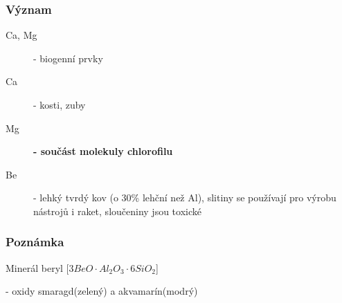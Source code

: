     \subsubsection{Význam}
    \begin{description}
        \item[Ca, Mg] - biogenní prvky
        \item[Ca] - kosti, zuby
        \item[Mg] \textbf{- součást molekuly chlorofilu}
        \item[Be] - lehký tvrdý kov (o 30\% lehční než Al), slitiny se používají pro výrobu nástrojů i raket, sloučeniny jsou toxické
    \end{description}

    \subsubsection{Poznámka}
    Minerál beryl [$3BeO \cdot Al_2O_3 \cdot 6SiO_2$]

    - oxidy smaragd(zelený) a akvamarín(modrý)
